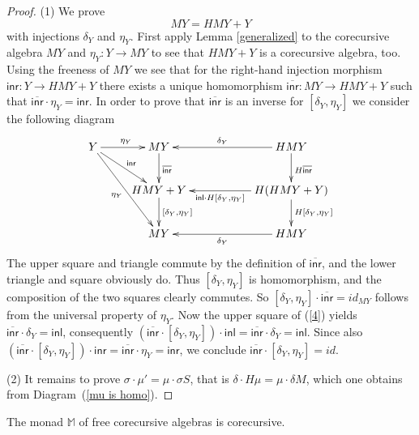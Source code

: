 \documentclass{LMCS}
\theoremstyle{plain}
\theoremstyle{definition}
\numberwithin{equation}{section}
\def\o{\cdot}
\begin{document}
\begin{proof}
(1) We prove $$MY=HMY+Y$$ with injections $\delta_Y$ and
$\eta_Y$. First apply Lemma \ref{generalized} to the corecursive
algebra $MY$ and $\eta_Y:Y\rightarrow MY$ to see that $HMY+Y$ is a
corecursive algebra, too. Using the freeness of $MY$ we see that for
the right-hand injection morphism $\mathsf{inr}:Y\rightarrow HMY+Y$
there exists a unique homomorphism
$\overline{\mathsf{inr}}:MY\rightarrow HMY+Y$ such that
$\overline{\mathsf{inr}} \o \eta_Y = \mathsf{inr}$. In order to prove
that $\overline{\mathsf{inr}}$ is an inverse for $[\delta_Y,\eta_Y]$
we consider the following diagram 
\begin{equation}\label{4}\vcenter{
\xymatrix{
Y\ar[r]^{\eta_Y}\ar[rd]^{\mathsf{inr}}\ar[rdd]_{\eta_Y}&MY\ar[d]^{\overline{\mathsf{inr}}}&&HMY\ar[ll]_-{\delta_Y}\ar[d]^{H\overline{\mathsf{inr}}}\\
&HMY+Y\ar[d]^{[\delta_Y,\eta_Y]}&&H(HMY+Y)\ar[d]^{H[\delta_Y,\eta_Y]}\ar[ll]^-{\mathsf{inl}\cdot H[\delta_Y,\eta_Y]}\\
&MY&&HMY\ar[ll]^-{\delta_Y}
}}
\end{equation}
The upper square and triangle commute by the definition of
$\overline{\mathsf{inr}}$, and the lower triangle and square obviously do. Thus $[\delta_Y,\eta_Y]$ is homomorphism, and the composition of the two squares clearly commutes. So $[\delta_Y,\eta_Y]\cdot\overline{\mathsf{inr}}=id_{MY}$ follows from the universal property of $\eta_Y$. Now the upper square of (\ref{4}) yields $\overline{\mathsf{inr}}\cdot\delta_Y=\mathsf{inl}$, consequently $(\overline{\mathsf{inr}}\cdot[\delta_Y,\eta_Y])\cdot\mathsf{inl}=\overline{\mathsf{inr}}\cdot\delta_Y=\mathsf{inl}$. Since also $(\overline{\mathsf{inr}}\cdot[\delta_Y,\eta_Y])\cdot\mathsf{inr}=\overline{\mathsf{inr}}\cdot\eta_Y=\mathsf{inr}$,
we conclude $\overline{\mathsf{inr}}\cdot[\delta_Y,\eta_Y]=id.$

(2) It remains to prove $\sigma\cdot\mu'=\mu\cdot \sigma S$, that is
$\delta\cdot H\mu=\mu\cdot \delta M$, which one obtains from Diagram~(\ref{mu is homo}).
\end{proof}

\begin{thm}
The monad $\mathbb M$ of free corecursive algebras is corecursive.
\end{thm}
\end{document}
